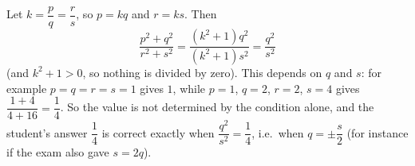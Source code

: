 Let $k=\dfrac {p}{q}=\dfrac {r}{s}$, so $p=kq$ and $r=ks$. Then
\[
\dfrac{p^2+q^2}{r^2+s^2}=\dfrac{(k^2+1)q^2}{(k^2+1)s^2}=\boxed{\dfrac{q^2}{s^2}}
\]
(and $k^2+1>0$, so nothing is divided by zero). This depends on $q$ and $s$: for example $p=q=r=s=1$ gives $1$, while $p=1$, $q=2$, $r=2$, $s=4$ gives $\dfrac{1+4}{4+16}=\dfrac{1}{4}$. So the value is not determined by the condition alone, and the student's answer $\dfrac{1}{4}$ is correct exactly when $\dfrac{q^2}{s^2}=\dfrac{1}{4}$, i.e.\ when $q=\pm\dfrac {s}{2}$ (for instance if the exam also gave $s=2q$).
